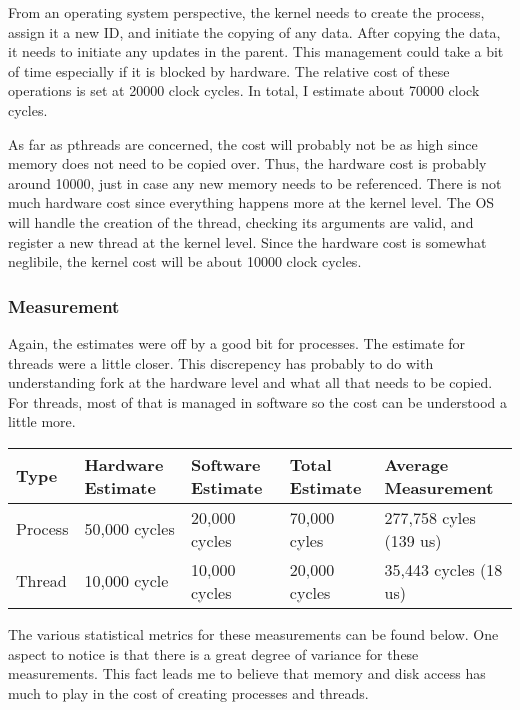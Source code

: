 \documentclass[paper=a4, fontsize=11pt]{scrartcl}
\numberwithin{equation}{section}        %
\numberwithin{figure}{section}          %
\numberwithin{table}{section}               %
\begin{document}
From an operating system perspective, the kernel needs to create the process, assign it a new ID, and initiate the copying of any data.  After copying the data, it needs to initiate any updates in the parent.  This management could take a bit of time especially if it is blocked by hardware.  The relative cost of these operations is set at 20000 clock cycles.  In total, I estimate about 70000 clock cycles.

As far as pthreads are concerned, the cost will probably not be as high since memory does not need to be copied over.  Thus, the hardware cost is probably around 10000, just in case any new memory needs to be referenced.  There is not much hardware cost since everything happens more at the kernel level.  The OS will handle the creation of the thread, checking its arguments are valid, and register a new thread at the kernel level.  Since the hardware cost is somewhat neglibile, the kernel cost will be about 10000 clock cycles. 

\subsubsection{Measurement}

Again, the estimates were off by a good bit for processes.  The estimate for threads were a little closer.  This discrepency has probably to do with understanding fork at the hardware level and what all that needs to be copied.  For threads, most of that is managed in software so the cost can be understood a little more.

\begin{center}
    \begin{tabular}{ | l | l | l | l | l |}
    \hline
    Type & Hardware Estimate & Software Estimate & Total Estimate & Average Measurement \\      \hline
    Process & 50,000 cycles & 20,000 cycles & 70,000 cyles & 277,758 cyles (139 us) \\ 
    Thread & 10,000 cycle & 10,000 cycles & 20,000 cycles & 35,443 cycles (18 us) \\
    \hline
    \end{tabular}
\end{center}

The various statistical metrics for these measurements can be found below.  One aspect to notice is that there is a great degree of variance for these measurements.  This fact leads me to believe that memory and disk access has much to play in the cost of creating processes and threads.
\end{document}
